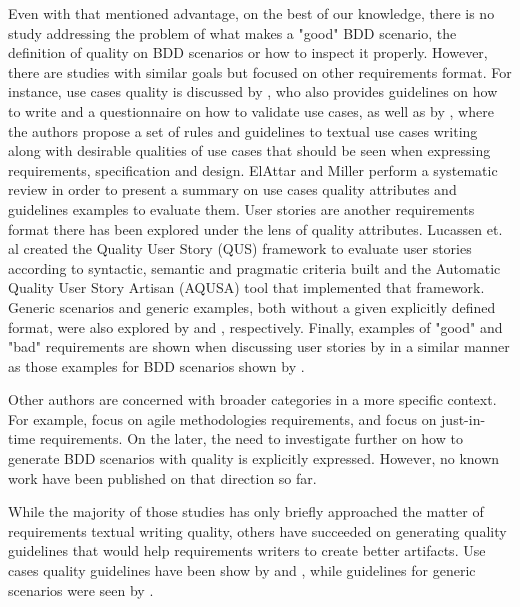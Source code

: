 Even with that mentioned advantage, on the best of our knowledge, there  is no study addressing the problem of what makes a "good" BDD scenario, the definition of quality on BDD scenarios or how to inspect it properly. However, there are studies with similar goals but focused on other requirements format. For instance, use cases quality is discussed by \cite{Cockburn_2000}, who also provides guidelines on how to write and a questionnaire on how to validate use cases, as well as by \cite{Phalp_2011}, where the authors propose a set of rules and guidelines to textual use cases writing along with desirable qualities of use cases that should be seen when expressing requirements, specification and design. ElAttar and Miller \cite{Attar_2012} perform a systematic review in order to present a summary on use cases quality attributes and guidelines examples to evaluate them. User stories are another requirements format there has been explored under the lens of quality attributes. Lucassen et. al \cite{Lucassen_2015} created the Quality User Story (QUS) framework to evaluate user stories according to syntactic, semantic and pragmatic criteria built and the Automatic Quality User Story Artisan (AQUSA) tool that implemented that framework. Generic scenarios and generic examples, both without a given explicitly defined format, were also explored by \cite{Alexander_2004} and \cite{Adzic_2011}, respectively. Finally, examples of "good" and "bad" requirements are shown when discussing user stories by \cite{Lucassen_2015} in a similar manner as those examples for BDD scenarios shown by \cite{Smart_2014}.

Other authors are concerned with broader categories in a more specific context. For example, \cite{Duncan_2001} focus on agile methodologies requirements, and \cite{Heck_2015} focus on just-in-time requirements. On the later, the need to investigate further on how to generate BDD scenarios with quality is explicitly expressed. However, no known work have been published on that direction so far.

While the majority of those studies has only briefly approached the matter of requirements textual writing quality, others have succeeded on generating quality guidelines that would help requirements writers to create better artifacts. Use cases quality guidelines have been show by \cite{Cockburn_2000} and \cite{Phalp_2011}, while guidelines for generic scenarios were seen by \cite{Alexander_2004}. 

